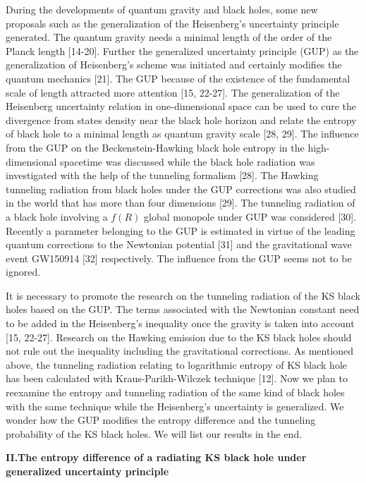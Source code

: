 \documentclass[graphicx, 12pt]{article}
\begin{document}
During the developments of quantum gravity and black holes, some
new proposals such as the generalization of the Heisenberg's
uncertainty principle generated. The quantum gravity needs a
minimal length of the order of the Planck length [14-20]. Further
the generalized uncertainty principle (GUP) as the generalization
of Heisenberg's scheme was initiated and certainly modifies the
quantum mechanics [21]. The GUP because of the existence of the
fundamental scale of length attracted more attention [15, 22-27].
The generalization of the Heisenberg uncertainty relation in
one-dimensional space can be used to cure the divergence from
states density near the black hole horizon and relate the entropy
of black hole to a minimal length as quantum gravity scale [28,
29]. The influence from the GUP on the Beckenstein-Hawking black
hole entropy in the high-dimensional spacetime was discussed while
the black hole radiation was investigated with the help of the
tunneling formalism [28]. The Hawking tunneling radiation from
black holes under the GUP corrections was also studied in the
world that has more than four dimensions [29]. The tunneling
radiation of a black hole involving a $f(R)$ global monopole under
GUP was considered [30]. Recently a parameter belonging to the GUP
is estimated in virtue of the leading quantum corrections to the
Newtonian potential [31] and the gravitational wave event GW150914
[32] respectively. The influence from the GUP seems not to be
ignored.

It is necessary to promote the research on the tunneling radiation
of the KS black holes based on the GUP. The terms associated with
the Newtonian constant need to be added in the Heisenberg's
inequality once the gravity is taken into account [15, 22-27].
Research on the Hawking emission due to the KS black holes should
not rule out the inequality including the gravitational
corrections. As mentioned above, the tunneling radiation relating
to logarithmic entropy of KS black hole has been calculated with
Kraus-Parikh-Wilczek technique [12]. Now we plan to reexamine the
entropy and tunneling radiation of the same kind of black holes
with the same technique while the Heisenberg's uncertainty is
generalized. We wonder how the GUP modifies the entropy difference
and the tunneling probability of the KS black holes. We will list
our results in the end.


\vspace{0.8cm} \noindent \textbf{II.\hspace{0.4cm}The entropy
difference of a radiating KS black hole under generalized
uncertainty principle}
\end{document}
